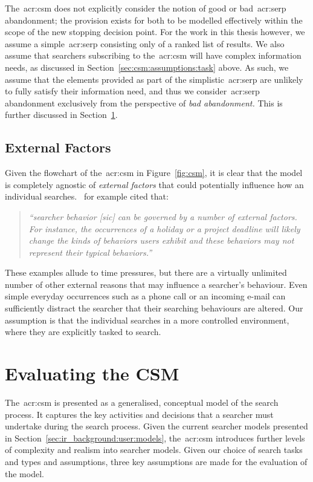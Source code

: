 The~\gls{acr:csm} does not explicitly consider the notion of good or bad~\gls{acr:serp} abandonment; the provision exists for both to be modelled effectively within the scope of the new stopping decision point. For the work in this thesis however, we assume a simple~\gls{acr:serp} consisting only of a ranked list of results. We also assume that searchers subscribing to the~\gls{acr:csm} will have complex information needs, as discussed in Section~\ref{sec:csm:assumptions:task} above. As such, we assume that the elements provided as part of the simplistic~\gls{acr:serp} are unlikely to fully satisfy their information need, and thus we consider~\gls{acr:serp} abandonment exclusively from the perspective of \emph{bad abandonment.} This is further discussed in Section~\ref{sec:csm:evaluation}.

\subsection{External Factors}
Given the flowchart of the~\gls{acr:csm} in Figure~\ref{fig:csm}, it is clear that the model is completely agnostic of \emph{external factors} that could potentially influence how an individual searches.~\cite{kelly2009iir} for example cited that:

\begin{quote}
    \emph{``searcher behavior [sic] can be governed by a number of external factors. For instance, the occurrences of a holiday or a project deadline will likely change the kinds of behaviors users exhibit and these behaviors may not represent their typical behaviors.''}
\end{quote}

These examples allude to time pressures, but there are a virtually unlimited number of other external reasons that may influence a searcher's behaviour. Even simple everyday occurrences such as a phone call or an incoming e-mail can sufficiently distract the searcher that their searching behaviours are altered. Our assumption is that the individual searches in a more controlled environment, where they are explicitly tasked to search.

\section{Evaluating the CSM}\label{sec:csm:evaluation}
The~\gls{acr:csm} is presented as a generalised, conceptual model of the search process. It captures the key activities and decisions that a searcher must undertake during the search process. Given the current searcher models presented in Section~\ref{sec:ir_background:user:models}, the~\gls{acr:csm} introduces further levels of complexity and realism into searcher models. Given our choice of search tasks and types and assumptions, three key assumptions are made for the evaluation of the model.

